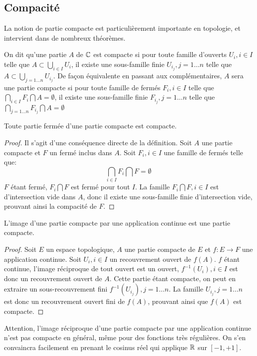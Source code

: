 \subsection{Compacité}
La notion de partie compacte est particulièrement importante en topologie, et intervient dans de nombreux théorèmes. 
\begin{fdefn}
	On dit qu'une partie $A$ de $\mathbb{C}$ est compacte si pour toute famille d'ouverts $U_i, i \in I$ telle que $A \subset \bigcup_{i\in I} U_i $, il existe une sous-famille finie $U_{i_j}, j=1\dots n$ telle que $A \subset\bigcup_{j=1\dots n} U_{i_j}$. De façon équivalente en passant aux complémentaires, $A$ sera une partie compacte si pour toute famille de fermés $F_i, i \in I$ telle que $\bigcap_{i\in I} F_i \bigcap A= \emptyset$, il existe une sous-famille finie $F_{i_j}, j=1\dots n$ telle que $\bigcap_{j=1\dots n} F_{i_j} \bigcap A= \emptyset$
\end{fdefn}
\begin{fprop}
	Toute partie fermée d'une partie compacte est compacte.
\end{fprop}
\begin{proof}
	Il s'agit d'une conséquence directe de la définition. Soit $A$ une partie compacte et $F$ un fermé inclus dans $A$. Soit $F_i, i \in I$ une famille de fermés telle que:
	\[
	\bigcap_{i \in I} F_i \bigcap F = \emptyset
	\]
	$F$ étant fermé, $F_i \bigcap F$ est fermé pour tout $I$. La famille $F_i \bigcap F, i \in I$ est d'intersection vide dans $A$, donc il existe une sous-famille finie d'intersection vide, prouvant ainsi la compacité de $F$. 
\end{proof}
\begin{fprop}
L'image d'une partie compacte par une application continue est une partie compacte. 
\end{fprop}
\begin{proof}
Soit $E$ un espace topologique, $A$ une partie compacte de $E$ et $f \colon E \to F$ une application continue. Soit $U_i, i \in I$ un recouvrement ouvert de $f(A)$. $f$ étant continue, l'image réciproque de tout ouvert est un ouvert, $f^{-1}(U_i), i \in I$ est donc un recouvrement ouvert de $A$. Cette partie étant compacte, on peut en extraire un sous-recouvrement fini $f^{-1}(U_{i_j}), j=1\dots n$. La famille $U_{i_j},j=1\dots n$ est donc un recouvrement ouvert fini de $f(A)$, prouvant ainsi que $f(A)$ est compacte. 
\end{proof}
\begin{rem}
Attention, l'image réciproque d'une partie compacte par une application continue n'est pas compacte en général, même pour des fonctions très régulières. On s'en convaincra facilement en prenant le cosinus réel qui applique $\mathbb R$ sur $[-1,+1]$.
\end{rem}
